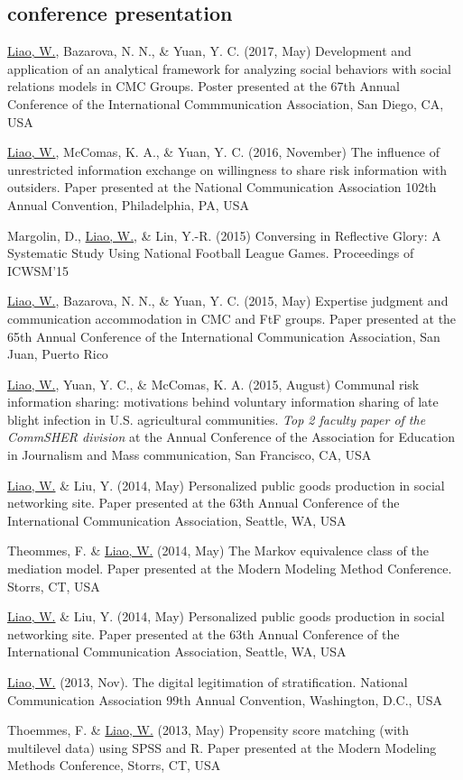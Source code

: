 \documentclass[11pt, letterpaper]{article} %
\newcommand{\years}[1]{\leavevmode\marginnote{\scriptsize #1}} %
\begin{document}
\subsection*{conference presentation}
\begin{hangparas}{.25in}{1}

\underline{Liao, W.}, \years{2017} Bazarova, N. N., \& Yuan, Y. C. (2017, May) Development and application of an analytical framework for analyzing social behaviors with social relations models in CMC Groups. Poster presented at the 67th Annual Conference of the International Commmunication Association, San Diego, CA, USA

\underline{Liao, W.}, \years{2016} McComas, K. A., \& Yuan, Y. C. (2016, November) The influence of unrestricted information exchange on willingness to share risk information with outsiders. Paper presented at the National Communication Association 102th Annual Convention, Philadelphia, PA, USA

Margolin, D., \years{2015} \underline{Liao, W.}, \& Lin, Y.-R. (2015) Conversing in Reflective Glory: A Systematic Study Using National Football League Games. Proceedings of ICWSM’15

\underline{Liao, W.}, Bazarova, N. N., \& Yuan, Y. C. (2015, May) Expertise judgment and communication accommodation in CMC and FtF groups. Paper presented at the 65th Annual Conference of the International Communication Association, San Juan, Puerto Rico

\underline{Liao, W.}, Yuan, Y. C., \& McComas, K. A. (2015, August) Communal risk information sharing: motivations behind voluntary information sharing of late blight infection in U.S. agricultural communities. \textsl{Top 2 faculty paper of the CommSHER division} at the Annual Conference of the Association for Education in Journalism and Mass communication, San Francisco, CA, USA

\underline{Liao, W.} \years{2012-2014}\& Liu, Y. (2014, May) Personalized public goods production in social networking site. Paper presented at the 63th Annual Conference of the International Communication Association, Seattle, WA, USA

Theommes, F. \& \underline{Liao, W.} (2014, May) The Markov equivalence class of the mediation model. Paper presented at the Modern Modeling Method Conference. Storrs, CT, USA

\underline{Liao, W.} \& Liu, Y. (2014, May) Personalized public goods production in social networking site. Paper presented at the 63th Annual Conference of the International Communication Association, Seattle, WA, USA

\underline{Liao, W.} (2013, Nov). The digital legitimation of stratification. National Communication Association 99th Annual Convention, Washington, D.C., USA

Thoemmes, F. \& \underline{Liao, W.} (2013, May) Propensity score matching (with multilevel data) using SPSS and R. Paper presented at the Modern Modeling Methods Conference, Storrs, CT, USA
\end{hangparas}
\end{document}
